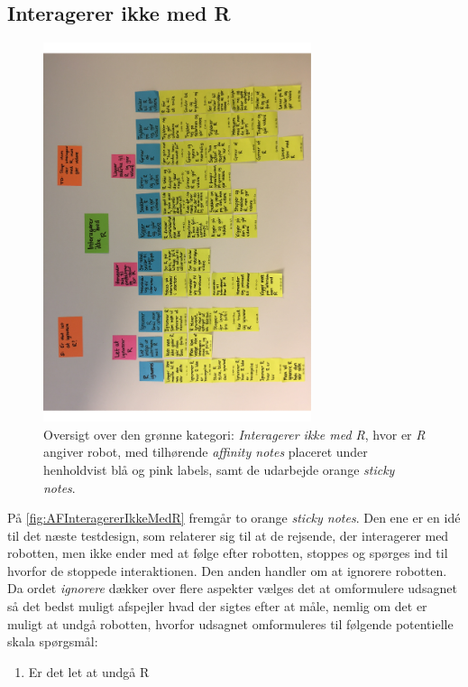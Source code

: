 \subsection{Interagerer ikke med R}
\label{ParametreInteragererIkkeMedR}
%
\begin{figure}[H]
\centering
\includegraphics[width = 0.7\textwidth, angle = -90]{Figure/AffinityDiagram/InteragererIkkeMedR} 
\caption{Oversigt over den grønne kategori: \textit{Interagerer ikke med R}, hvor er \textit{R} angiver robot, med tilhørende \textit{affinity notes} placeret under henholdvist blå og pink labels, samt de udarbejde orange \textit{sticky notes}.}
\label{fig:AFInteragererIkkeMedR}
\end{figure}
\noindent
%
På \autoref{fig:AFInteragererIkkeMedR} fremgår to orange \textit{sticky notes}. Den ene er en idé til det næste testdesign, som relaterer sig til at de rejsende, der interagerer med robotten, men ikke ender med at følge efter robotten, stoppes og spørges ind til hvorfor de stoppede interaktionen. Den anden handler om at ignorere robotten. Da ordet \textit{ignorere} dækker over flere aspekter vælges det at omformulere udsagnet så det bedst muligt afspejler hvad der sigtes efter at måle, nemlig om det er muligt at undgå robotten, hvorfor udsagnet omformuleres til følgende potentielle skala spørgsmål:\blankline 
%
\begin{enumerate}
  \item Er det let at undgå R\blankline
\end{enumerate} 
